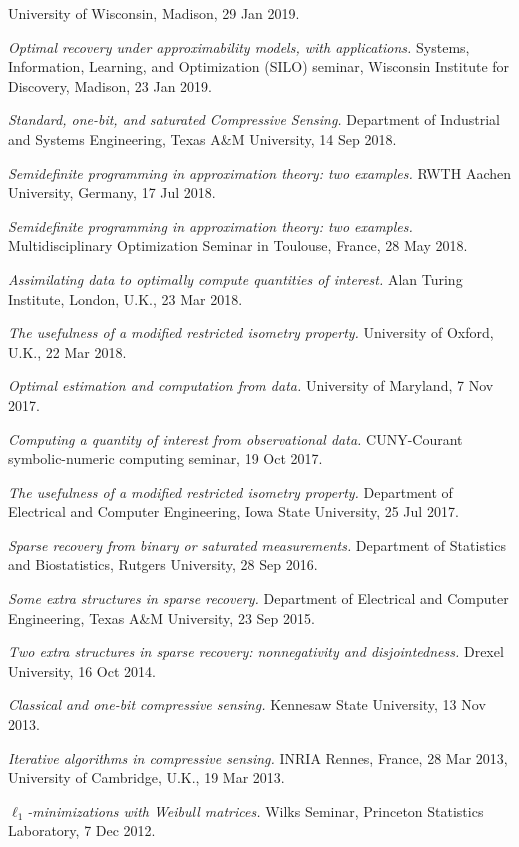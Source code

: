 \documentclass[11pt]{article}
\begin{document}
University of Wisconsin, Madison, 29 Jan 2019.
\item {\sl Optimal recovery under approximability models, with applications.}
Systems, Information, Learning, and Optimization (SILO) seminar,
Wisconsin Institute for Discovery, Madison, 23 Jan 2019.
\item {\sl Standard, one-bit, and saturated Compressive Sensing.}
Department of Industrial and Systems Engineering, Texas A\&M University, 14 Sep 2018.
\item {\sl Semidefinite programming in approximation theory: two examples.}
RWTH Aachen University, Germany, 17 Jul 2018.
\item {\sl Semidefinite programming in approximation theory: two examples.} Multidisciplinary Optimization Seminar in Toulouse, France, 28 May 2018.
\item {\sl Assimilating data to optimally compute quantities of interest.} Alan Turing Institute, London, U.K., 23 Mar 2018.
\item {\sl The usefulness of a modified restricted isometry property.} University of Oxford, U.K., 22 Mar 2018.
\item {\sl Optimal estimation and computation from data.} University of Maryland, 7 Nov 2017.
\item {\sl Computing a quantity of interest from observational data.} CUNY-Courant symbolic-numeric computing seminar, 19 Oct 2017.
\item {\sl The usefulness of a modified restricted isometry property.} Department of Electrical and Computer Engineering, Iowa State University, 25 Jul 2017.
\item {\sl Sparse recovery from binary or saturated measurements.} Department of Statistics and Biostatistics, Rutgers University, 28 Sep 2016.
\item {\sl Some extra structures in sparse recovery.} Department of Electrical and Computer Engineering, Texas A\&M University, 23 Sep 2015.
\item {\sl Two extra structures in sparse recovery: nonnegativity and disjointedness.} Drexel University, 16 Oct 2014.
\item {\sl Classical and one-bit compressive sensing.} 
Kennesaw State University, 13 Nov 2013.
\item {\sl Iterative algorithms in compressive sensing.} INRIA Rennes, France, 28 Mar 2013,
University of Cambridge, U.K., 19 Mar 2013. 
\item {\sl $\ell_1$-minimizations with Weibull matrices.} Wilks Seminar, Princeton Statistics Laboratory, 7 Dec 2012.
\end{document}
